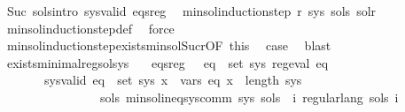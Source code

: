 \begin{isabellebody}
\ Suc\ sols{\isacharunderscore}{\kern0pt}intro\ sys{\isacharunderscore}{\kern0pt}valid\ eqs{\isacharunderscore}{\kern0pt}reg\ \isamarkupfalse%
\ {\isachardoublequoteopen}min{\isacharunderscore}{\kern0pt}sol{\isacharunderscore}{\kern0pt}induction{\isacharunderscore}{\kern0pt}step\ r\ sys\ sols\ sol{\isacharunderscore}{\kern0pt}r{\isachardoublequoteclose}\isanewline
\ \ \ \ \isamarkupfalse%
\ min{\isacharunderscore}{\kern0pt}sol{\isacharunderscore}{\kern0pt}induction{\isacharunderscore}{\kern0pt}step{\isacharunderscore}{\kern0pt}def\ \isamarkupfalse%
\ force\isanewline
\ \ \isamarkupfalse%
\ min{\isacharunderscore}{\kern0pt}sol{\isacharunderscore}{\kern0pt}induction{\isacharunderscore}{\kern0pt}step{\isachardot}{\kern0pt}exists{\isacharunderscore}{\kern0pt}min{\isacharunderscore}{\kern0pt}sol{\isacharunderscore}{\kern0pt}Suc{\isacharunderscore}{\kern0pt}r{\isacharbrackleft}{\kern0pt}OF\ this{\isacharbrackright}{\kern0pt}\ \isamarkupfalse%
\ {\isacharquery}{\kern0pt}case\ \isamarkupfalse%
\ blast\isanewline
{}\isamarkupfalse%
%
\endisatagproof
{\isafoldproof}%
%
\isadelimproof
\isanewline
%
\endisadelimproof
\isanewline
{}\isamarkupfalse%
\ exists{\isacharunderscore}{\kern0pt}minimal{\isacharunderscore}{\kern0pt}reg{\isacharunderscore}{\kern0pt}sol{\isacharunderscore}{\kern0pt}sys{\isacharcolon}{\kern0pt}\isanewline
\ \ \ eqs{\isacharunderscore}{\kern0pt}reg{\isacharcolon}{\kern0pt}\ \ \ {\isachardoublequoteopen}{\isasymforall}eq\ {\isasymin}\ set\ sys{\isachardot}{\kern0pt}\ reg{\isacharunderscore}{\kern0pt}eval\ eq{\isachardoublequoteclose}\isanewline
\ \ \ \ \ \ \ sys{\isacharunderscore}{\kern0pt}valid{\isacharcolon}{\kern0pt}\ {\isachardoublequoteopen}{\isasymforall}eq\ {\isasymin}\ set\ sys{\isachardot}{\kern0pt}\ {\isasymforall}x\ {\isasymin}\ vars\ eq{\isachardot}{\kern0pt}\ x\ {\isacharless}{\kern0pt}\ length\ sys{\isachardoublequoteclose}\isanewline
\ \ \ \ \ \ \ \ \ \ \ \ \ \ \ \ {\isachardoublequoteopen}{\isasymexists}sols{\isachardot}{\kern0pt}\ min{\isacharunderscore}{\kern0pt}sol{\isacharunderscore}{\kern0pt}ineq{\isacharunderscore}{\kern0pt}sys{\isacharunderscore}{\kern0pt}comm\ sys\ sols\ {\isasymand}\ {\isacharparenleft}{\kern0pt}{\isasymforall}i{\isachardot}{\kern0pt}\ regular{\isacharunderscore}{\kern0pt}lang\ {\isacharparenleft}{\kern0pt}sols\ i{\isacharparenright}{\kern0pt}{\isacharparenright}{\kern0pt}{\isachardoublequoteclose}\isanewline

\end{isabellebody}
